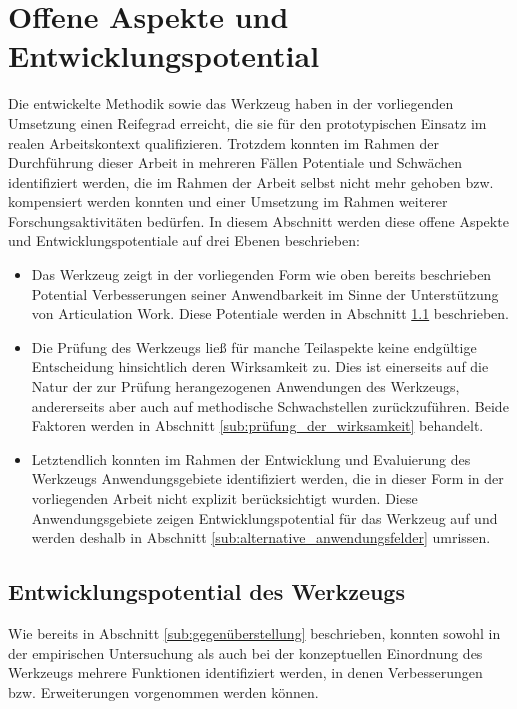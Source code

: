 
\section{Offene Aspekte und Entwicklungspotential}
\label{sec:offene_aspekte_und_entwicklungspotential}

Die entwickelte Methodik sowie das Werkzeug haben in der vorliegenden Umsetzung einen Reifegrad erreicht, die sie für den prototypischen Einsatz im realen Arbeitskontext qualifizieren. Trotzdem konnten im Rahmen der Durchführung dieser Arbeit in mehreren Fällen Potentiale und Schwächen identifiziert werden, die im Rahmen der Arbeit selbst nicht mehr gehoben bzw. kompensiert werden konnten und einer Umsetzung im Rahmen weiterer Forschungsaktivitäten bedürfen. In diesem Abschnitt werden diese offene Aspekte und Entwicklungspotentiale auf drei Ebenen beschrieben:

\begin{itemize}
	\item Das Werkzeug zeigt in der vorliegenden Form wie oben bereits beschrieben Potential Verbesserungen seiner Anwendbarkeit im Sinne der Unterstützung von Articulation Work. Diese Potentiale werden in Abschnitt \ref{sub:entwicklungspotential_des_werkzeugs} beschrieben.
	\item Die Prüfung des Werkzeugs ließ für manche Teilaspekte keine endgültige Entscheidung hinsichtlich deren Wirksamkeit zu. Dies ist einerseits auf die Natur der zur Prüfung herangezogenen Anwendungen des Werkzeugs, andererseits aber auch auf methodische Schwachstellen zurückzuführen. Beide Faktoren werden in Abschnitt \ref{sub:prüfung_der_wirksamkeit} behandelt.
	\item Letztendlich konnten im Rahmen der Entwicklung und Evaluierung des Werkzeugs Anwendungsgebiete identifiziert werden, die in dieser Form in der vorliegenden Arbeit nicht explizit berücksichtigt wurden. Diese Anwendungsgebiete zeigen Entwicklungspotential für das Werkzeug auf und werden deshalb in Abschnitt \ref{sub:alternative_anwendungsfelder} umrissen.
\end{itemize}

\subsection{Entwicklungspotential des Werkzeugs} %
\label{sub:entwicklungspotential_des_werkzeugs}

Wie bereits in Abschnitt \ref{sub:gegenüberstellung} beschrieben, konnten sowohl in der empirischen Untersuchung als auch bei der konzeptuellen Einordnung des Werkzeugs mehrere Funktionen identifiziert werden, in denen Verbesserungen bzw. Erweiterungen vorgenommen werden können.

